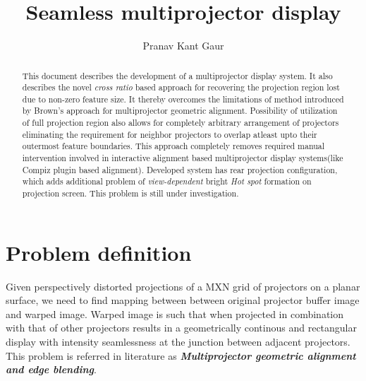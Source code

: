 \documentclass{article}
\begin{document}
\title{Seamless multiprojector display}
\author{Pranav Kant Gaur}

\maketitle

\begin{abstract}
This document describes the development of a multiprojector display system. It also describes the novel \textit{cross ratio} based approach for recovering the projection region lost due to non-zero feature size. It thereby overcomes the limitations of method introduced by Brown's\cite{1} approach for multiprojector geometric alignment. Possibility of utilization of full projection region also allows for completely arbitrary arrangement of projectors eliminating the requirement for neighbor projectors to overlap atleast upto their outermost feature boundaries. This approach completely removes required manual intervention involved in interactive alignment based multiprojector display systems(like Compiz plugin based alignment). Developed system has rear projection configuration, which adds additional problem of \textit{view-dependent} bright \textit{Hot spot} formation on projection screen. This problem is still under investigation.
\end{abstract}

\section{Problem definition}
Given perspectively distorted projections of a MXN grid of projectors on a planar surface, we need to find mapping between between original projector buffer image and warped image. Warped image is such that when projected in combination with that of other projectors results in a geometrically continous and rectangular display with intensity seamlessness at the junction between adjacent projectors. This problem is referred in literature as \textbf{\textit{Multiprojector geometric alignment and edge blending}}.
\end{document}
